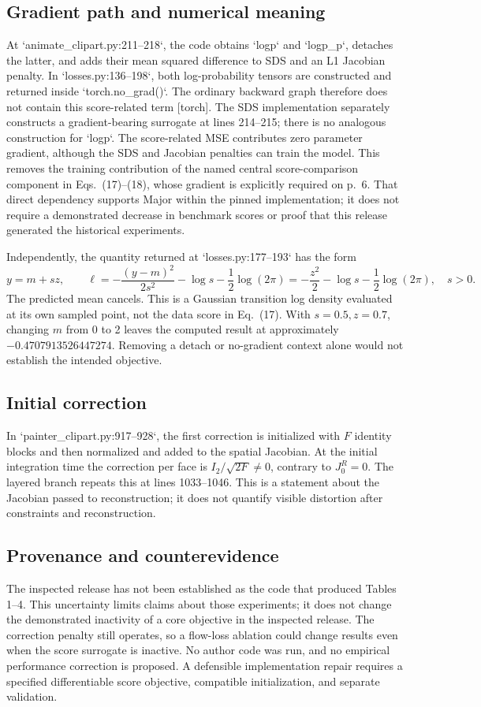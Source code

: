 \documentclass[10pt]{article}
\begin{document}
\subsection*{Gradient path and numerical meaning}
At `animate\_clipart.py:211–218`, the code obtains `logp` and `logp\_p`, detaches the latter, and adds their mean squared difference to SDS and an L1 Jacobian penalty. In `losses.py:136–198`, both log-probability tensors are constructed and returned inside `torch.no\_grad()`. The ordinary backward graph therefore does not contain this score-related term [torch]. The SDS implementation separately constructs a gradient-bearing surrogate at lines 214–215; there is no analogous construction for `logp`. The score-related MSE contributes zero parameter gradient, although the SDS and Jacobian penalties can train the model. This removes the training contribution of the named central score-comparison component in Eqs. (17)–(18), whose gradient is explicitly required on p. 6. That direct dependency supports Major within the pinned implementation; it does not require a demonstrated decrease in benchmark scores or proof that this release generated the historical experiments.\par
Independently, the quantity returned at `losses.py:177–193` has the form \[y=m+sz,\qquad
 \ell=-\frac{(y-m)^2}{2s^2}-\log s-\frac12\log(2\pi)
      =-\frac{z^2}{2}-\log s-\frac12\log(2\pi),\quad s>0.\] The predicted mean cancels. This is a Gaussian transition log density evaluated at its own sampled point, not the data score in Eq. (17). With \(s=0.5,z=0.7\), changing \(m\) from 0 to 2 leaves the computed result at approximately \(-0.4707913526447274\). Removing a detach or no-gradient context alone would not establish the intended objective.\par
\subsection*{Initial correction}
In `painter\_clipart.py:917–928`, the first correction is initialized with \(F\) identity blocks and then normalized and added to the spatial Jacobian. At the initial integration time the correction per face is \(I_2/\sqrt{2F}\ne0\), contrary to \(J_0^R=0\). The layered branch repeats this at lines 1033–1046. This is a statement about the Jacobian passed to reconstruction; it does not quantify visible distortion after constraints and reconstruction.\par
\subsection*{Provenance and counterevidence}
The inspected release has not been established as the code that produced Tables 1–4. This uncertainty limits claims about those experiments; it does not change the demonstrated inactivity of a core objective in the inspected release. The correction penalty still operates, so a flow-loss ablation could change results even when the score surrogate is inactive. No author code was run, and no empirical performance correction is proposed. A defensible implementation repair requires a specified differentiable score objective, compatible initialization, and separate validation.\par
\end{document}
